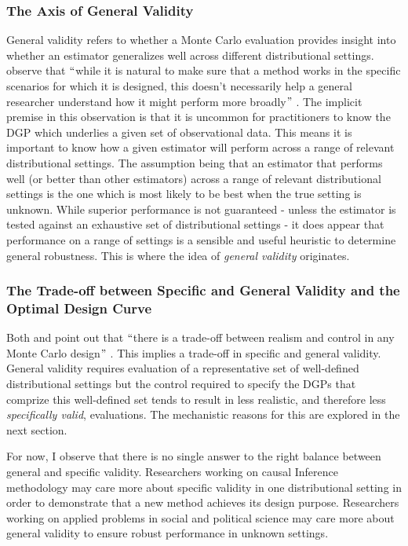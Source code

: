 \documentclass[../main.tex]{subfiles}
\begin{document}
\subsubsection{The Axis of General Validity}

General validity refers to whether a Monte Carlo evaluation provides insight into whether an estimator generalizes well across different distributional settings. \cite{Dorie2019Automated1} observe that $``$while it is natural to make sure that a method works in the specific scenarios for which it is designed, this doesn’t necessarily help a general researcher understand how it might perform more broadly$"$ . The implicit premise in this observation is that it is uncommon for practitioners to know the DGP which underlies a given set of observational data. This means it is important to know how a given estimator will perform across a range of relevant distributional settings. The assumption being that an estimator that performs well (or better than other estimators) across a range of relevant distributional settings is the one which is most likely to be best when the true setting is unknown. While superior performance is not guaranteed - unless the estimator is tested against an exhaustive set of distributional settings - it does appear that performance on a range of settings is a sensible and useful heuristic to determine general robustness. This is where the idea of \textit{general validity }originates.\par

\subsubsection{The Trade-off between Specific and General Validity and the Optimal Design Curve}

Both \cite{Paxton2001MonteImplementation} and \cite{Wendling2018ComparingDatabases} point out that $``$there is a trade-off between realism and control in any Monte Carlo design$"$ \cite{Paxton2001MonteImplementation}. This implies a trade-off in specific and general validity. General validity requires evaluation of a representative set of well-defined distributional settings but the control required to specify the DGPs that comprize this well-defined set tends to result in less realistic, and therefore less \textit{specifically valid}, evaluations. The mechanistic reasons for this are explored in the next section.\par


\vspace{\baselineskip}
For now, I observe that there is no single answer to the right balance between general and specific validity. Researchers working on causal Inference methodology may care more about specific validity in one distributional setting in order to demonstrate that a new method achieves its design purpose. Researchers working on applied problems in social and political science may care more about general validity to ensure robust performance in unknown settings.\par
\end{document}
